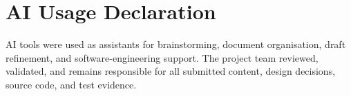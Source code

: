 \chapter*{AI Usage Declaration}

AI tools were used as assistants for brainstorming, document organisation,
draft refinement, and software-engineering support. The project team
reviewed, validated, and remains responsible for all submitted content,
design decisions, source code, and test evidence.
